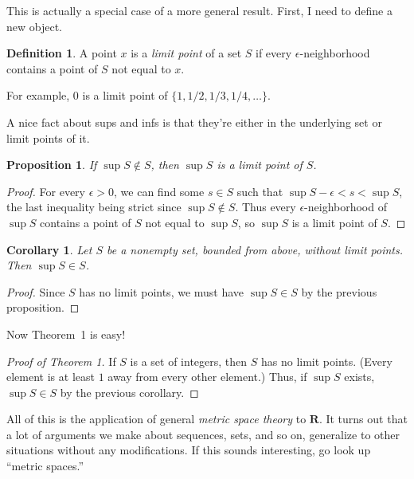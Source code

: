 \documentclass[12pt]{article}
\newtheorem{proposition}{Proposition}
\newtheorem{corollary}{Corollary}
\theoremstyle{definition}
\newtheorem{definition}{Definition}
\let\set\mathbf
\begin{document}
This is actually a special case of a more general result. First, I need to
define a new object.

\begin{definition}
    A point $x$ is a \emph{limit point} of a set $S$ if every
    $\epsilon$-neighborhood contains a point of $S$ not equal to $x$.
\end{definition}

For example, $0$ is a limit point of $\{1, 1 / 2, 1 / 3, 1 / 4, \dots\}$.

A nice fact about sups and infs is that they're either in the underlying set or
limit points of it.

\begin{proposition}
    If $\sup S \notin S$, then $\sup S$ is a limit point of $S$.
\end{proposition}

\begin{proof}
    For every $\epsilon > 0$, we can find some $s \in S$ such that $\sup S -
    \epsilon < s < \sup S$, the last inequality being strict since $\sup S
    \notin S$. Thus every $\epsilon$-neighborhood of $\sup S$ contains a point
    of $S$ not equal to $\sup S$, so $\sup S$ is a limit point of $S$.
\end{proof}

\begin{corollary}
    Let $S$ be a nonempty set, bounded from above, without limit points. Then
    $\sup S \in S$.
\end{corollary}

\begin{proof}
    Since $S$ has no limit points, we must have $\sup S \in S$ by the previous
    proposition.
\end{proof}

Now Theorem~1 is easy!

\begin{proof}[Proof of Theorem 1]
    If $S$ is a set of integers, then $S$ has no limit points. (Every element
    is at least $1$ away from every other element.) Thus, if $\sup S$ exists,
    $\sup S \in S$ by the previous corollary.
\end{proof}

All of this is the application of general \emph{metric space theory} to
$\set{R}$. It turns out that a lot of arguments we make about sequences, sets,
and so on, generalize to other situations without any modifications. If this
sounds interesting, go look up ``metric spaces.''
\end{document}
